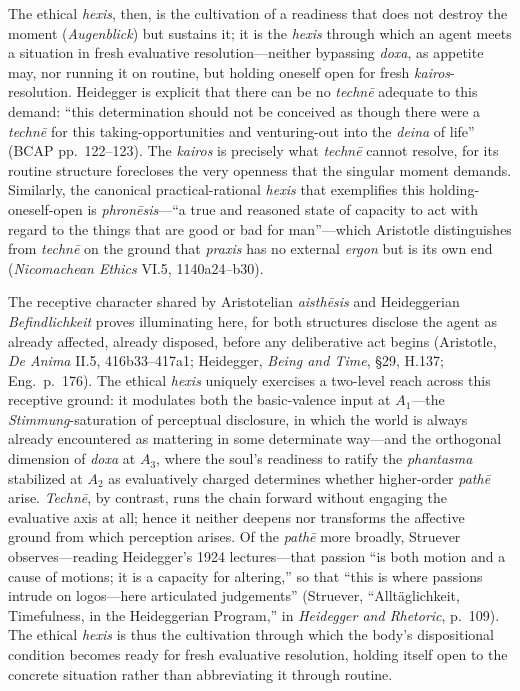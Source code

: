 \documentclass{article}
\begin{document}
The ethical \textit{hexis}, then, is the cultivation of a readiness that does not destroy the moment (\textit{Augenblick}) but sustains it; it is the \textit{hexis} through which an agent meets a situation in fresh evaluative resolution---neither bypassing \textit{doxa}, as appetite may, nor running it on routine, but holding oneself open for fresh \textit{kairos}-resolution. Heidegger is explicit that there can be no \textit{technē} adequate to this demand: ``this determination should not be conceived as though there were a \textit{technē} for this taking-opportunities and venturing-out into the \textit{deina} of life'' (BCAP pp.~122--123). The \textit{kairos} is precisely what \textit{technē} cannot resolve, for its routine structure forecloses the very openness that the singular moment demands. Similarly, the canonical practical-rational \textit{hexis} that exemplifies this holding-oneself-open is \textit{phronēsis}---``a true and reasoned state of capacity to act with regard to the things that are good or bad for man''---which Aristotle distinguishes from \textit{technē} on the ground that \textit{praxis} has no external \textit{ergon} but is its own end (\textit{Nicomachean Ethics} VI.5, 1140a24--b30).

The receptive character shared by Aristotelian \textit{aisthēsis} and Heideggerian \textit{Befindlichkeit} proves illuminating here, for both structures disclose the agent as already affected, already disposed, before any deliberative act begins (Aristotle, \textit{De Anima} II.5, 416b33--417a1; Heidegger, \textit{Being and Time}, \S 29, H.137; Eng.~p.~176). The ethical \textit{hexis} uniquely exercises a two-level reach across this receptive ground: it modulates both the basic-valence input at $A_1$---the \textit{Stimmung}-saturation of perceptual disclosure, in which the world is always already encountered as mattering in some determinate way---and the orthogonal dimension of \textit{doxa} at $A_3$, where the soul's readiness to ratify the \textit{phantasma} stabilized at $A_2$ as evaluatively charged determines whether higher-order \textit{pathē} arise. \textit{Technē}, by contrast, runs the chain forward without engaging the evaluative axis at all; hence it neither deepens nor transforms the affective ground from which perception arises. Of the \textit{pathē} more broadly, Struever observes---reading Heidegger's 1924 lectures---that passion ``is both motion and a cause of motions; it is a capacity for altering,'' so that ``this is where passions intrude on logos---here articulated judgements'' (Struever, ``Alltäglichkeit, Timefulness, in the Heideggerian Program,'' in \textit{Heidegger and Rhetoric}, p.~109). The ethical \textit{hexis} is thus the cultivation through which the body's dispositional condition becomes ready for fresh evaluative resolution, holding itself open to the concrete situation rather than abbreviating it through routine.
\end{document}
